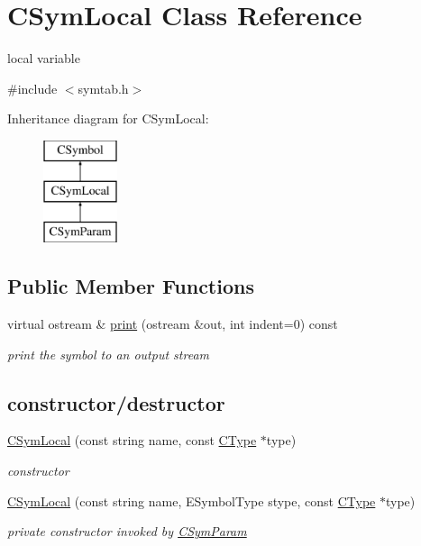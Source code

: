 \hypertarget{classCSymLocal}{\section{C\-Sym\-Local Class Reference}
\label{classCSymLocal}
}


local variable  




{\ttfamily \#include $<$symtab.\-h$>$}

Inheritance diagram for C\-Sym\-Local\-:\begin{figure}[H]
\begin{center}
\leavevmode
\includegraphics[height=3.000000cm]{classCSymLocal}
\end{center}
\end{figure}
\subsection*{Public Member Functions}
\begin{DoxyCompactItemize}
\item 
virtual ostream \& \hyperlink{classCSymLocal_a7f6989353e48305f8496e8a0f34a056e}{print} (ostream \&out, int indent=0) const 
\begin{DoxyCompactList}\small\item\em print the symbol to an output stream \end{DoxyCompactList}\end{DoxyCompactItemize}
\subsection*{constructor/destructor}
\begin{DoxyCompactItemize}
\item 
\hyperlink{classCSymLocal_a2737c0514878bbfc780f9d0c148c27e1}{C\-Sym\-Local} (const string name, const \hyperlink{classCType}{C\-Type} $\ast$type)
\begin{DoxyCompactList}\small\item\em constructor \end{DoxyCompactList}\item 
\hyperlink{classCSymLocal_ac73e6df3f125664ba2b6596e267e30b1}{C\-Sym\-Local} (const string name, E\-Symbol\-Type stype, const \hyperlink{classCType}{C\-Type} $\ast$type)
\begin{DoxyCompactList}\small\item\em private constructor invoked by \hyperlink{classCSymParam}{C\-Sym\-Param} \end{DoxyCompactList}\end{DoxyCompactItemize}


